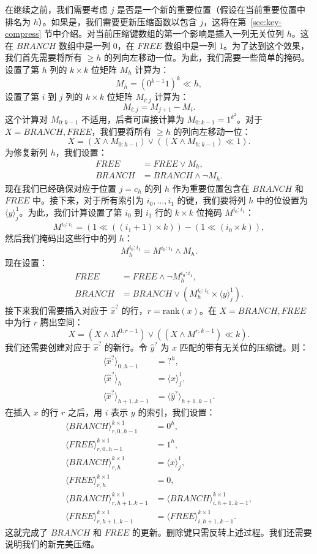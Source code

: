 \documentclass[11pt,a4paper]{ctexart}
\newcommand{\tto}{\text{0}}
\newcommand{\ttl}{\text{1}}
\newcommand{\ttq}{\text{?}}
\newcommand{\lpiece}[3]{\langle #1 \rangle_{#2}^{#3}}
\newcommand{\lpieceq}[2]{\langle #1 \rangle_{#2}}
\newcommand{\AND}{\land}
\newcommand{\OR}{\lor}
\newcommand{\NOT}{\lnot}
\newcommand{\LSHIFT}{\ll}
\newcommand{\RANK}{\text{rank}}
\begin{document}
在继续之前，我们需要考虑 $j$ 是否是一个新的重要位置（假设在当前重要位置中排名为 $h$）。如果是，我们需要更新压缩函数以包含 $j$，这将在第~\ref{sec:key-compress} 节中介绍。对当前压缩键数组的第一个影响是插入一列无关位列 $h$。这在 $BRANCH$ 数组中是一列 $\tto$，在 $FREE$ 数组中是一列 $\ttl$。为了达到这个效果，我们首先需要将所有 $\geq h$ 的列向左移动一位。为此，我们需要一些简单的掩码。设置了第 $h$ 列的 $k \times k$ 位矩阵 $M_h$ 计算为：
\[
M_h = (\tto^{k-1}\ttl)^k \LSHIFT h,
\]
设置了第 $i$ 到 $j$ 列的 $k \times k$ 位矩阵 $M_{i:j}$ 计算为：
\[
M_{i:j} = M_{j+1} - M_i.
\]
这个计算对 $M_{0:k-1}$ 不适用，后者可直接计算为 $M_{0:k-1} = \ttl^{k^2}$。对于 $X = BRANCH, FREE$，我们要将所有 $\geq h$ 的列向左移动一位：
\[
X = (X \AND M_{0:h-1}) \OR ((X \AND M_{h:k-1}) \LSHIFT 1).
\]
为修复新列 $h$，我们设置：
\begin{align*}
FREE &= FREE \OR M_h,\\
BRANCH &= BRANCH \AND \NOT M_h.
\end{align*}
现在我们已经确保对应于位置 $j = c_h$ 的列 $h$ 作为重要位置包含在 $BRANCH$ 和 $FREE$ 中。接下来，对于所有索引为 $i_0, \dots, i_1$ 的键，我们要将列 $h$ 中的位设置为 $\lpiece{y}{j}{1}$。为此，我们计算设置了第 $i_0$ 到 $i_1$ 行的 $k \times k$ 位掩码 $M^{i_0:i_1}$：
\[
M^{i_0:i_1} = (1 \LSHIFT ((i_1+1) \times k)) - (1 \LSHIFT (i_0 \times k)),
\]
然后我们掩码出这些行中的列 $h$：
\[
M^{i_0:i_1}_h = M^{i_0:i_1} \AND M_h.
\]
现在设置：
\begin{align*}
FREE &= FREE \AND \NOT M^{i_0:i_1}_h,\\
BRANCH &= BRANCH \OR (M^{i_0:i_1}_h \times \lpiece{y}{j}{1}).
\end{align*}
接下来我们需要插入对应于 $\hat{x}^{\ttq}$ 的行，$r = \RANK(x)$。在 $X = BRANCH, FREE$ 中为行 $r$ 腾出空间：
\[
X = (X \AND M^{0:r-1}) \OR ((X \AND M^{r:k-1}) \LSHIFT k).
\]
我们还需要创建对应于 $\hat{x}^{\ttq}$ 的新行。令 $\hat{y}^{\ttq}$ 为 $x$ 匹配的带有无关位的压缩键。则：
\begin{align*}
\lpieceq{\hat{x}^{\ttq}}{0..h-1} &= \ttq^h,\\
\lpieceq{\hat{x}^{\ttq}}{h} &= \lpiece{x}{j}{1},\\
\lpieceq{\hat{x}^{\ttq}}{h+1..k-1} &= \lpieceq{\hat{y}^{\ttq}}{h+1..k-1}.
\end{align*}
在插入 $x$ 的行 $r$ 之后，用 $i$ 表示 $y$ 的索引，我们设置：
\begin{align*}
\lpiece{BRANCH}{r,0..h-1}{k \times 1} &= \tto^h,\\
\lpiece{FREE}{r,0..h-1}{k \times 1} &= \ttl^h,\\
\lpiece{BRANCH}{r,h}{k \times 1} &= \lpiece{x}{j}{1},\\
\lpiece{FREE}{r,h}{k \times 1} &= \tto,\\
\lpiece{BRANCH}{r,h+1..k-1}{k \times 1} &= \lpiece{BRANCH}{i,h+1..k-1}{k \times 1},\\
\lpiece{FREE}{r,h+1..k-1}{k \times 1} &= \lpiece{FREE}{i,h+1..k-1}{k \times 1}.
\end{align*}
这就完成了 $BRANCH$ 和 $FREE$ 的更新。删除键只需反转上述过程。我们还需要说明我们的新完美压缩。
\end{document}
